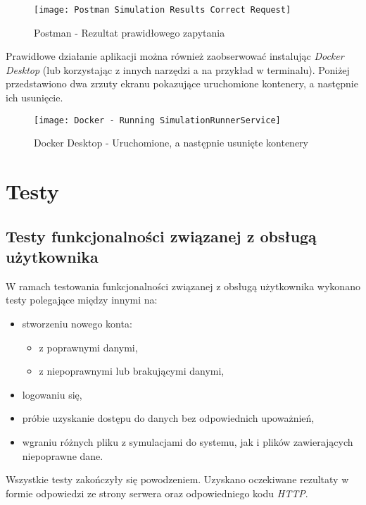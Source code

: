 \begin{figure}[H]
	\texttt{[image: Postman Simulation Results Correct Request]}
	\caption{Postman - Rezultat prawidłowego zapytania}
\end{figure}

\par Prawidłowe działanie aplikacji można również zaobserwować instalując \emph{Docker Desktop} (lub korzystając z innych narzędzi \emph{\docker{}}a na przykład w terminalu). Poniżej przedstawiono dwa zrzuty ekranu pokazujące uruchomione kontenery, a następnie ich usunięcie.

\begin{figure}[H]
	\texttt{[image: Docker - Running SimulationRunnerService]}
	\caption{Docker Desktop - Uruchomione, a następnie usunięte kontenery}
\end{figure}

\section{Testy}

\subsection{Testy funkcjonalności związanej z obsługą użytkownika}

\par W ramach testowania funkcjonalności związanej z obsługą użytkownika wykonano testy polegające między innymi na:
\begin{itemize}
	\item stworzeniu nowego konta:
	\begin{itemize}
		\item z poprawnymi danymi,
		\item z niepoprawnymi lub brakującymi danymi,
	\end{itemize}
	\item logowaniu się,
	\item próbie uzyskanie dostępu do danych bez odpowiednich upoważnień,
	\item wgraniu różnych pliku z symulacjami do systemu, jak i plików zawierających niepoprawne dane.
\end{itemize}

Wszystkie testy zakończyły się powodzeniem. Uzyskano oczekiwane rezultaty w formie odpowiedzi ze strony serwera oraz odpowiedniego kodu \emph{HTTP}.

